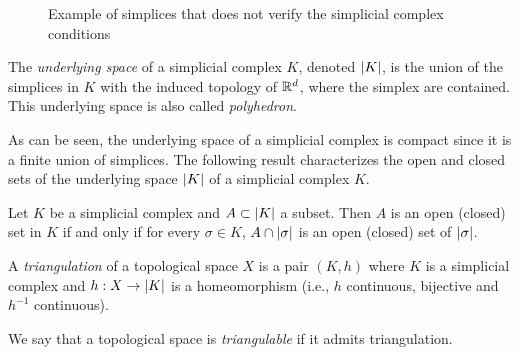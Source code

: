 \documentclass[../main.tex]{subfiles}
\begin{document}
\begin{figure}[ht]
\centering
{}
\caption{Example of simplices that does not verify the simplicial complex conditions}
\label{fig:noComp}
\end{figure}

\begin{definition}
The \emph{underlying space} of a simplicial complex $K$, denoted $\left\lvert K \right\rvert$, is the union of the simplices in $K$ with the induced topology of $\mathbb{R}^d$, where the simplex are contained. This underlying space is also called \emph{polyhedron}.
\end{definition}
As can be seen, the underlying space of a simplicial complex is compact since it is a finite union of simplices. The following result characterizes the open and closed sets of the underlying space $\left\lvert K \right\rvert$ of a simplicial complex $K$.

\begin{proposition}
Let $K$ be a simplicial complex and ${A \subset \left\lvert K \right\rvert}$ a subset. Then $A$ is an open (closed) set in $K$ if and only if for every $\sigma \in K$, $A \cap \left\lvert \sigma \right\rvert$ is an open (closed) set of $\left\lvert \sigma \right\rvert$.
\end{proposition}

\begin{definition}
A \emph{triangulation} of a topological space $X$ is a pair $(K, h)$ where $K$ is a simplicial complex and $h: X \to \left\lvert K \right\rvert$ is a homeomorphism (i.e., $h $ continuous, bijective and $h^{-1}$ continuous).
\end{definition}
We say that a topological space is \emph{triangulable} if it admits triangulation.\\
\end{document}
